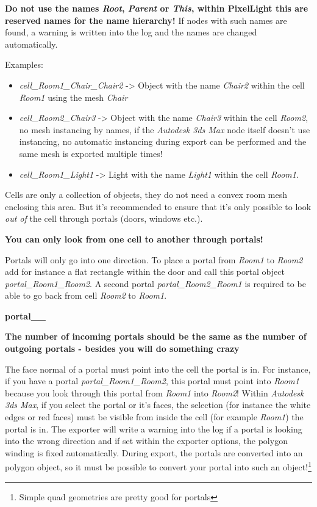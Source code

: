 \textbf{Do not use the names \emph{Root}, \emph{Parent} or \emph{This}, within PixelLight this are reserved names for the name hierarchy!} If nodes with such names are found, a warning is written into the log and the names are changed automatically.

Examples:
\begin{itemize}
\item{\emph{cell\_Room1\_Chair\_Chair2} -> Object with the name \emph{Chair2} within the cell \emph{Room1} using the mesh \emph{Chair}}
\item{\emph{cell\_Room2\_Chair3} -> Object with the name \emph{Chair3} within the cell \emph{Room2}, no mesh instancing by names, if the \emph{Autodesk 3ds Max} node itself doesn't use instancing, no automatic instancing during export can be performed and the same mesh is exported multiple times!}
\item{\emph{cell\_Room1\_Light1} -> Light with the name \emph{Light1} within the cell \emph{Room1}.}
\end{itemize}

Cells are only a collection of objects, they do not need a convex room mesh enclosing this area. But it's recommended to ensure that it's only possible to look \emph{out of} the cell through portals (doors, windows etc.).

\textbf{You can only look from one cell to another through portals!}

Portals will only go into one direction. To place a portal from \emph{Room1} to \emph{Room2} add for instance a flat rectangle within the door and call this portal object \emph{portal\_Room1\_Room2}. A second portal \emph{portal\_Room2\_Room1} is required to be able to go back from cell \emph{Room2} to \emph{Room1}.

\textbf{portal\_<from cell>\_<to cell>}

\textbf{The number of incoming portals should be the same as the number of outgoing portals - besides you will do something crazy}

The face normal of a portal must point into the cell the portal is in. For instance, if you have a portal \emph{portal\_Room1\_Room2}, this portal must point into \emph{Room1} because you look through this portal from \emph{Room1} into \emph{Room2}! Within \emph{Autodesk 3ds Max}, if you select the portal or it's faces, the selection (for instance the white edges or red faces) must be visible from inside the cell (for example \emph{Room1}) the portal is in. The exporter will write a warning into the log if a portal is looking into the wrong direction and if set within the exporter options, the polygon winding is fixed automatically. During export, the portals are converted into an polygon object, so it must be possible to convert your portal into such an object!\footnote{Simple quad geometries are pretty good for portals}

